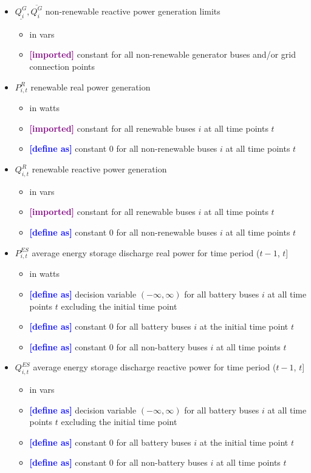 \documentclass{article}
\newcommand{\lo}[1]{\underline{#1}}
\newcommand{\hi}[1]{\overline{#1}}
\newcommand{\define}{\textcolor{blue}{\textbf{[define as] }}}
\newcommand{\imported}{\textcolor{purple}{\textbf{[imported] }}}
\begin{document}
\begin{itemize}
\item $\lo{Q^G_i}, \hi{Q^G_i}$ non-renewable reactive power generation limits
  \begin{itemize}
  \item in vars
  \item \imported constant for all non-renewable generator buses and/or grid
    connection points
  \end{itemize}

\item $P^R_{i,t}$ renewable real power generation
  \begin{itemize}
  \item in watts
  \item \imported constant for all renewable buses $i$ at all time points $t$
  \item \define constant $0$ for all non-renewable buses $i$ at all time points
    $t$
  \end{itemize}

\item $Q^R_{i,t}$ renewable reactive power generation
  \begin{itemize}
  \item in vars
  \item \imported constant for all renewable buses $i$ at all time points $t$
  \item \define constant $0$ for all non-renewable buses $i$ at all time points
    $t$
  \end{itemize}

\item $P^{ES}_{i,t}$ average energy storage discharge real power for time period
  ($t-1$, $t$]
  \begin{itemize}
  \item in watts
  \item \define decision variable $(-\infty, \infty)$ for all battery buses $i$
    at all time points $t$ excluding the initial time point
  \item \define constant $0$ for all battery buses $i$ at the initial time point
    $t$
  \item \define constant $0$ for all non-battery buses $i$ at all time points
    $t$
  \end{itemize}

\item $Q^{ES}_{i,t}$ average energy storage discharge reactive power for time
  period ($t-1$, $t$]
  \begin{itemize}
  \item in vars
  \item \define decision variable $(-\infty, \infty)$ for all battery buses $i$
    at all time points $t$ excluding the initial time point
  \item \define constant $0$ for all battery buses $i$ at the initial time point
    $t$
  \item \define constant $0$ for all non-battery buses $i$ at all time points
    $t$
  \end{itemize}



\end{itemize}
\end{document}
